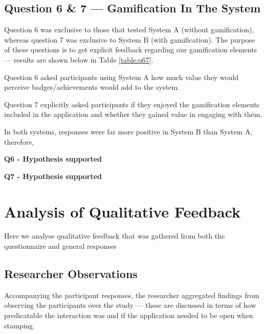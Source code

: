\subsection{Question 6 \& 7 --- Gamification In The System}
Question 6 was exclusive to those that tested System A (without gamification), whereas question 7 was exclusive to System B (with gamification). The purpose of these questions is to get explicit feedback regarding our gamification elements--- results are shown below in Table \ref{table:q67}.
    \begin{table}[H]
    \caption{Table showing answers to questions 6 and 7 from the study}
    \label{table:q67}
    \end{table}

    Question 6 asked participants using System A how much value they would perceive badges/achievements would add to the system.

    Question 7 explicitly asked participants if they enjoyed the gamification elements included in the application and whether they gained value in engaging with them.

    In both systems, responses were far more positive in System B than System A, therefore,

    \textbf{Q6 - Hypothesis supported}

    \textbf{Q7 - Hypothesis supported}

\section{Analysis of Qualitative Feedback}
\label{sec:qualitative}
Here we analyse qualitative feedback that was gathered from both the questionnaire and general responses
\subsection{Researcher Observations}
Accompanying the participant responses, the researcher aggregated findings from observing the participants over the study --- these are discussed in terms of how predicatable the interaction was and if the application needed to be open when stamping.
